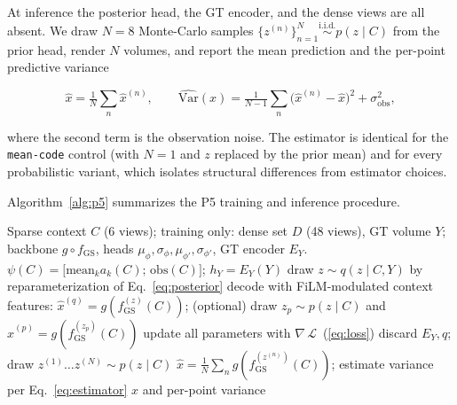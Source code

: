At inference the posterior head, the GT encoder, and the dense views are
all absent. We draw $N=8$ Monte-Carlo samples $\{z^{(n)}\}_{n=1}^{N}
\overset{\text{i.i.d.}}{\sim} p(z\mid C)$ from the prior head, render
$N$ volumes, and report the mean prediction and the per-point predictive
variance

\begin{equation}
    \hat{x}
    = \tfrac{1}{N}\textstyle\sum_{n} \hat{x}^{(n)},
    \qquad
    \widehat{\mathrm{Var}}(x)
    = \tfrac{1}{N-1}\textstyle\sum_{n}
      \big(\hat{x}^{(n)}-\hat{x}\big)^2 + \sigma_{\mathrm{obs}}^2 ,
    \label{eq:estimator}
\end{equation}

where the second term is the observation noise. The estimator is
identical for the \texttt{mean-code} control (with $N{=}1$ and $z$
replaced by the prior mean) and for every probabilistic variant, which
isolates structural differences from estimator choices.

Algorithm~\ref{alg:p5} summarizes the P5 training and inference
procedure.

\begin{algorithm}[t]
\caption{P5 GT-Conditioned CVAE Training and Inference}
\label{alg:p5}
\begin{algorithmic}[1]
\REQUIRE Sparse context $C$ (6 views); training only: dense set $D$ (48
views), GT volume $Y$; backbone $g\circ f_{\mathrm{GS}}$, heads
$\mu_\phi,\sigma_\phi,\mu_{\phi'},\sigma_{\phi'}$, GT encoder $E_Y$.
\STATE \quad $\psi(C)=\big[\mathrm{mean}_k a_k(C);\,\mathrm{obs}(C)\big]$;\;
$h_Y = E_Y(Y)$
\STATE \quad draw $z\sim q(z\mid C,Y)$ by reparameterization of
Eq.~\eqref{eq:posterior}
\STATE \quad decode with FiLM-modulated context features:
$\hat{x}^{(q)}=g(f_{\mathrm{GS}}^{(z)}(C))$;
\STATE \quad (optional) draw $z_p\sim p(z\mid C)$ and
$\hat{x}^{(p)}=g(f_{\mathrm{GS}}^{(z_p)}(C))$
\STATE \quad update all parameters with
$\nabla\,\mathcal{L}$~(\ref{eq:loss})
\STATE \quad discard $E_Y,q$; draw $z^{(1)}\dots z^{(N)}\sim p(z\mid C)$
\STATE \quad $\hat{x}=\tfrac1N\sum_n g(f_{\mathrm{GS}}^{(z^{(n)})}(C))$;
estimate variance per Eq.~\eqref{eq:estimator}
\RETURN $\hat{x}$ and per-point variance
\end{algorithmic}
\end{algorithm}